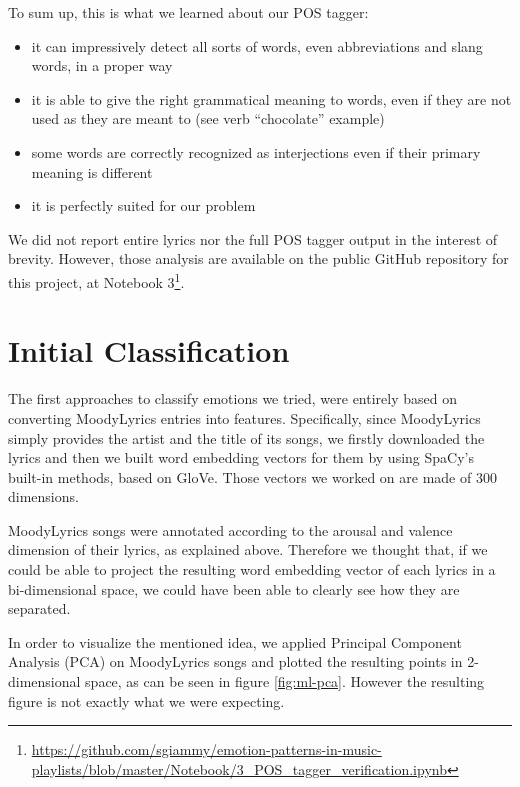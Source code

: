 To sum up, this is what we learned about our POS tagger:

\begin{itemize}
\item it can impressively detect all sorts of words, even abbreviations and slang words, in a proper way
\item it is able to give the right grammatical meaning to words, even if they are not used as they are meant to (see verb ``chocolate'' example)
\item some words are correctly recognized as interjections even if their primary meaning is different
\item it is perfectly suited for our problem	
\end{itemize}

We did not report entire lyrics nor the full POS tagger output in the interest of brevity. However, those analysis are available on the public GitHub repository for this project, at Notebook 3\footnote{\url{https://github.com/sgiammy/emotion-patterns-in-music-playlists/blob/master/Notebook/3_POS_tagger_verification.ipynb}}.

\section{Initial Classification}

The first approaches to classify emotions we tried, were entirely based on converting
MoodyLyrics entries into features. Specifically, since MoodyLyrics simply provides the
artist and the title of its songs, we firstly downloaded the lyrics and then we built
word embedding vectors for them by using SpaCy's built-in methods, based on GloVe.
Those vectors we worked on are made of 300 dimensions.

MoodyLyrics songs were annotated according to the arousal and valence dimension of their lyrics,
as explained above. Therefore we thought that, if we could be able to project the resulting
word embedding vector of each lyrics in a bi-dimensional space, we could have been able to 
clearly see how they are separated.

In order to visualize the mentioned idea, we applied Principal Component Analysis (PCA) on
MoodyLyrics songs and plotted the resulting points in 2-dimensional space, as can be seen in figure \ref{fig:ml-pca}. However the resulting figure is not exactly what we were expecting.


